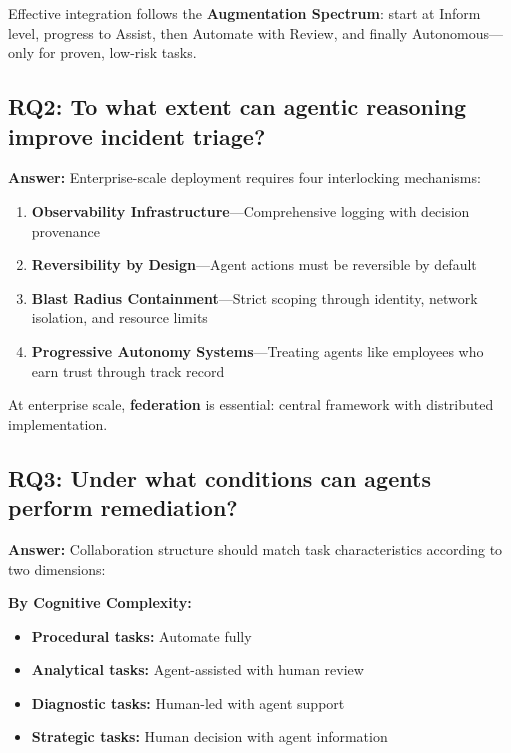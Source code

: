 Effective integration follows the \textbf{Augmentation Spectrum}: start at Inform level, progress to Assist, then Automate with Review, and finally Autonomous---only for proven, low-risk tasks.

\subsection{RQ2: To what extent can agentic reasoning improve incident triage?}
\label{subsec:rq2-answer}

\textbf{Answer:} Enterprise-scale deployment requires four interlocking mechanisms:

\begin{enumerate}
    \item \textbf{Observability Infrastructure}---Comprehensive logging with decision provenance
    \item \textbf{Reversibility by Design}---Agent actions must be reversible by default
    \item \textbf{Blast Radius Containment}---Strict scoping through identity, network isolation, and resource limits
    \item \textbf{Progressive Autonomy Systems}---Treating agents like employees who earn trust through track record
\end{enumerate}

At enterprise scale, \textbf{federation} is essential: central framework with distributed implementation.

\subsection{RQ3: Under what conditions can agents perform remediation?}
\label{subsec:rq3-answer}

\textbf{Answer:} Collaboration structure should match task characteristics according to two dimensions:

\textbf{By Cognitive Complexity:}
\begin{itemize}
    \item \textbf{Procedural tasks:} Automate fully
    \item \textbf{Analytical tasks:} Agent-assisted with human review
    \item \textbf{Diagnostic tasks:} Human-led with agent support
    \item \textbf{Strategic tasks:} Human decision with agent information
\end{itemize}

